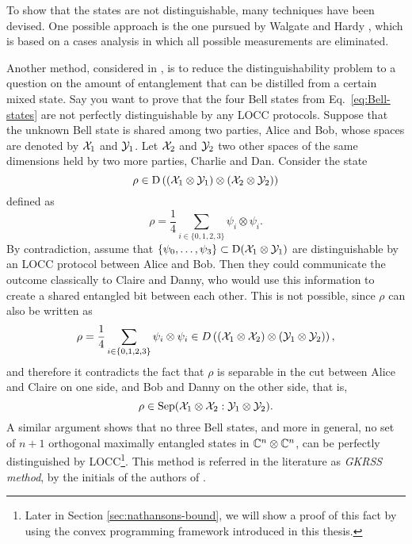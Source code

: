 To show that the states are not distinguishable, many techniques have been devised.
One possible approach is the one pursued by Walgate and Hardy \cite{Walgate02}, 
which is based on a cases analysis in which all possible measurements are eliminated. 

Another method, considered in \cite{Ghosh01,Ghosh04}, is to reduce the distinguishability 
problem to a question on the amount of entanglement that can be distilled from a 
certain mixed state. 
Say you want to prove that the four Bell states from Eq.~\eqref{eq:Bell-states}
are not perfectly distinguishable by any LOCC protocols.
Suppose that the unknown Bell state is shared among two parties, Alice and Bob,
whose spaces are denoted by $\mathcal{X}_{1}$ and $\mathcal{Y}_{1}$. Let $\mathcal{X}_{2}$ and $\mathcal{Y}_{2}$ two 
other spaces of the same dimensions held by two more parties, Charlie and Dan. 
Consider the state
\begin{equation}
  \rho \in \mathrm{D}\left((\mathcal{X}_{1}\otimes\mathcal{Y}_{1})\otimes(\mathcal{X}_{2}\otimes\mathcal{Y}_{2})\right)
\end{equation}
defined as
\begin{equation}
  \rho = \frac{1}{4}\sum_{i\in\{0,1,2,3\}}\psi_{i}\otimes\psi_{i}.
\end{equation}
By contradiction, assume that $\{\psi_{0}, \ldots, \psi_{3}\} \subset \mathrm{D}(\mathcal{X}_{1}\otimes\mathcal{Y}_{1})$
are distinguishable by an LOCC protocol between Alice and Bob.
Then they could communicate the outcome classically to Claire and Danny, 
who would use this information to create a shared entangled bit between each other.
This is not possible, since $\rho$ can also be written as  
\begin{equation}
  \rho = \frac{1}{4}\sum_{i\in\{0,1,2,3\}}\psi_{i}\otimes\psi_{i}
    \in D\left((\mathcal{X}_{1}\otimes\mathcal{X}_{2})\otimes(\mathcal{Y}_{1}\otimes\mathcal{Y}_{2})\right),
\end{equation}
and therefore it contradicts the fact that $\rho$ is separable in the cut 
between Alice and Claire on one side, and Bob and Danny on the other side, that is,
\begin{equation}
  \rho \in \mathrm{Sep}(\mathcal{X}_{1}\otimes\mathcal{X}_{2} : \mathcal{Y}_{1}\otimes\mathcal{Y}_{2}).
\end{equation}
A similar argument shows that no three Bell states, and more in general, 
no set of $n+1$ orthogonal maximally entangled states in $\mathbb{C}^{n}\otimes\mathbb{C}^{n}$, 
can be perfectly distinguished by LOCC\footnote{Later in Section \ref{sec:nathansons-bound}, 
we will show a proof of this fact by using the convex programming framework introduced in this thesis.}. 
This method is referred in the literature as \emph{GKRSS method}, 
by the initials of the authors of \cite{Ghosh01}.

